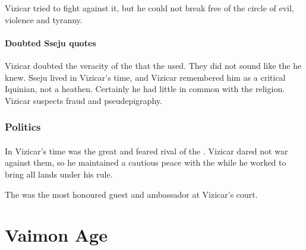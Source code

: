 Vizicar tried to fight against it, but he could not break free of the circle of evil, violence and tyranny. 





\subsubsection{Doubted Sseju quotes}
Vizicar doubted the veracity of the  that the \Ortaicans used. 
They did not sound like the  he knew. 
Sseju lived in Vizicar's time, and Vizicar remembered him as a critical Iquinian, not a heathen. 
Certainly he had little in common with the \Ortaican religion. 
Vizicar suspects fraud and pseudepigraphy. 









\subsection{Politics}





\subsubsection{\Shurco}
In Vizicar's time \Shurco was the great and feared rival of the \VaimonCaliphate.
Vizicar dared not war against them, so he maintained a cautious peace with the \Shurco while he worked to bring all \human lands under his rule. 

The   was the most honoured guest and ambassador at Vizicar's court. 





























\chapter{Vaimon Age}















